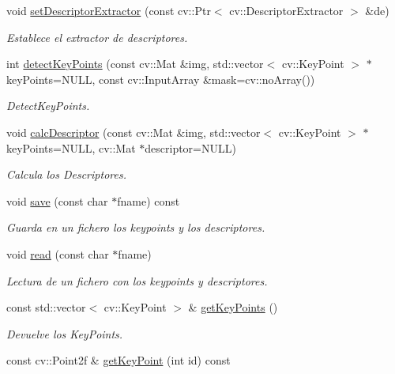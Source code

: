 \begin{DoxyCompactItemize}
void \hyperlink{class_i3_d_1_1_features2_d_a8c34027b40e0be15923e3d18fe668cdd}{set\+Descriptor\+Extractor} (const cv\+::\+Ptr$<$ cv\+::\+Descriptor\+Extractor $>$ \&de)
\begin{DoxyCompactList}\small\item\em Establece el extractor de descriptores. \end{DoxyCompactList}\item 
int \hyperlink{class_i3_d_1_1_features2_d_a62ecf2a0260a7cc171606038e9dff77f}{detect\+Key\+Points} (const cv\+::\+Mat \&img, std\+::vector$<$ cv\+::\+Key\+Point $>$ $\ast$key\+Points=N\+U\+LL, const cv\+::\+Input\+Array \&mask=cv\+::no\+Array())
\begin{DoxyCompactList}\small\item\em Detect\+Key\+Points. \end{DoxyCompactList}\item 
void \hyperlink{class_i3_d_1_1_features2_d_a5da82180382ed94fc8c197ea7f03911b}{calc\+Descriptor} (const cv\+::\+Mat \&img, std\+::vector$<$ cv\+::\+Key\+Point $>$ $\ast$key\+Points=N\+U\+LL, cv\+::\+Mat $\ast$descriptor=N\+U\+LL)
\begin{DoxyCompactList}\small\item\em Calcula los Descriptores. \end{DoxyCompactList}\item 
void \hyperlink{class_i3_d_1_1_features2_d_a9a6855620abadd6571352d3fbfd29381}{save} (const char $\ast$fname) const 
\begin{DoxyCompactList}\small\item\em Guarda en un fichero los keypoints y los descriptores. \end{DoxyCompactList}\item 
void \hyperlink{class_i3_d_1_1_features2_d_ae999316e0882a9c2a29a29e3e5b5e746}{read} (const char $\ast$fname)
\begin{DoxyCompactList}\small\item\em Lectura de un fichero con los keypoints y descriptores. \end{DoxyCompactList}\item 
const std\+::vector$<$ cv\+::\+Key\+Point $>$ \& \hyperlink{class_i3_d_1_1_features2_d_a5543362d3c3d1f1e0072ac1b8090217a}{get\+Key\+Points} ()
\begin{DoxyCompactList}\small\item\em Devuelve los Key\+Points. \end{DoxyCompactList}\item 
const cv\+::\+Point2f \& \hyperlink{class_i3_d_1_1_features2_d_a608ffbdddbe15df01ac14ab9400ab5d7}{get\+Key\+Point} (int id) const 

\end{DoxyCompactItemize}
